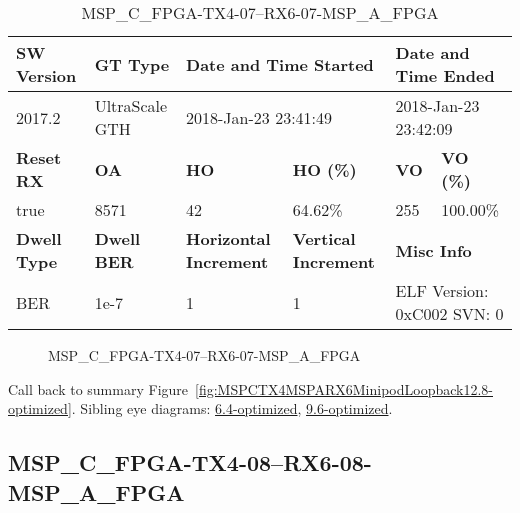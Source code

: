 \begin{table}[h]
\centering
\caption{MSP\_C\_FPGA-TX4-07--RX6-07-MSP\_A\_FPGA}
\label{tab:MSPCFPGATX407RX607MSPAFPGA12.8-optimized}
\begin{tabular}{@{}|l|l|l|l|l|l|@{}}
\toprule
\textbf{SW Version}                & \textbf{GT Type}   & \multicolumn{2}{l|}{\textbf{Date and Time Started}}            & \multicolumn{2}{l|}{\textbf{Date and Time Ended}}        \\ \midrule
2017.2                       & UltraScale GTH          & \multicolumn{2}{l|}{2018-Jan-23 23:41:49}                   & \multicolumn{2}{l|}{2018-Jan-23 23:42:09}               \\ \midrule
\textbf{Reset RX}                  & \textbf{OA} & \textbf{HO}   & \textbf{HO (\%)} & \textbf{VO} & \textbf{VO (\%)} \\ \midrule
true & 8571        & 42          & 64.62\%        & 255        & 100.00\%       \\ \midrule
\textbf{Dwell Type}                & \textbf{Dwell BER} & \textbf{Horizontal Increment} & \textbf{Vertical Increment}    & \multicolumn{2}{l|}{\textbf{Misc Info}}                  \\ \midrule
BER                            & 1e-7        & 1        & 1           & \multicolumn{2}{l|}{ELF Version: 0xC002 SVN: 0}                         \\ \bottomrule
\end{tabular}
\end{table}

\begin{figure}[h]
\caption{MSP\_C\_FPGA-TX4-07--RX6-07-MSP\_A\_FPGA} \label{fig:MSPCFPGATX407RX607MSPAFPGA12.8-optimized}
\end{figure}

Call back to summary Figure~\ref{fig:MSPCTX4MSPARX6MinipodLoopback12.8-optimized}.
Sibling eye diagrams: \hyperref[sec:MSPCFPGATX407RX607MSPAFPGA6.4-optimized]{6.4-optimized}, \hyperref[sec:MSPCFPGATX407RX607MSPAFPGA9.6-optimized]{9.6-optimized}.

\clearpage
\newpage


\subsection{MSP\_C\_FPGA-TX4-08--RX6-08-MSP\_A\_FPGA}\label{sec:MSPCFPGATX408RX608MSPAFPGA12.8-optimized}

